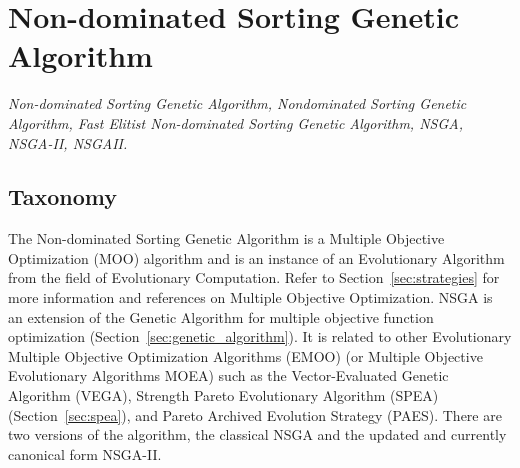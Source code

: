 

\section{Non-dominated Sorting Genetic Algorithm} 
\label{sec:nsga}

\emph{Non-dominated Sorting Genetic Algorithm, Nondominated Sorting Genetic Algorithm, Fast Elitist Non-dominated Sorting Genetic Algorithm, NSGA, NSGA-II, NSGAII.}

\subsection{Taxonomy}
The Non-dominated Sorting Genetic Algorithm is a Multiple Objective Optimization (MOO) algorithm and is an instance of an Evolutionary Algorithm from the field of Evolutionary Computation. Refer to Section~\ref{sec:strategies} for more information and references on Multiple Objective Optimization.
NSGA is an extension of the Genetic Algorithm for multiple objective function optimization (Section~\ref{sec:genetic_algorithm}).
It is related to other Evolutionary Multiple Objective Optimization Algorithms (EMOO) (or Multiple Objective Evolutionary Algorithms MOEA) such as the Vector-Evaluated Genetic Algorithm (VEGA), Strength Pareto Evolutionary Algorithm (SPEA) (Section~\ref{sec:spea}), and Pareto Archived Evolution Strategy (PAES).
There are two versions of the algorithm, the classical NSGA and the updated and currently canonical form NSGA-II.

